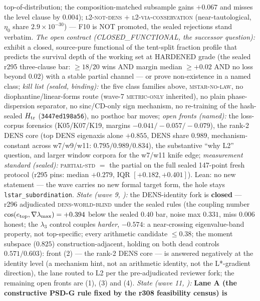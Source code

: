 \documentclass[11pt,a4paper]{article}
\begin{document}
{top-of-distribution; the composition-matched subsample gains
$+0.067$ and misses the level clause by $0.004$);
\textsc{l2-not-dens} $+$ \textsc{l2-via-conservation}
(near-tautological, $\eta_0$ share $2.9\times10^{-30}$) --- F10 is
NOT promoted, the sealed rejections stand verbatim.  \emph{The open
contract (CLOSED\_FUNCTIONAL, the successor question):} exhibit a
closed, source-pure functional of the tent-split fraction profile
that predicts the survival depth of the working set at HARDENED
grade (the sealed r295 three-clause bar: $\ge 18/20$ wins AND
margin median $\ge +0.02$ AND no loss beyond $0.02$) with a stable
partial channel --- or prove non-existence in a named class;
\emph{kill list (sealed, binding):} the five class families above,
\textsc{mstar-no-law}, no diophantine/linear-forms route (wave-7
\textsc{metric-only} inherited), no plain phase-dispersion
separator, no sinc/CD-only sign mechanism, no re-training of the
hash-sealed $H_{\rm tr}$ (\texttt{3447ed198a56}), no posthoc bar
moves; \emph{open fronts (named):} the loss-corpus forensics
(K05/K07/K19, margins $-0.041/-0.057/-0.079$), the rank-2 DENS core
(top DENS eigenaxis alone $+0.855$, DENS share $0.989$,
mechanism-constant across w7/w9/w11: $0.795/0.989/0.834$), the
substantive ``why L2'' question, and larger window corpora for the
w7/w11 knife edge; \emph{measurement standard (sealed):}
\textsc{partial-std} $=$ the partial on the full sealed 147-point
fresh protocol (r295 pins: median $+0.279$, IQR $[+0.182,
+0.401]$).  Lean: no new statement --- the wave carries no new
formal target form, the hole stays \texttt{lstar\_subordination}.
\emph{State (wave 9, ):} the
DENS-identity fork is \textbf{closed} --- r296 adjudicated
\textsc{dens-world-blind} under the sealed rules (the coupling
number $\cos(e_{\rm top}, \nabla\lambda_{\max}) = +0.394$ below the
sealed $0.40$ bar, noise max $0.331$, miss $0.006$ honest; the
$\lambda_3$ control couples \emph{harder}, $-0.574$: a
near-crossing eigenvalue-band property, not top-specific; every
arithmetic candidate $\le 0.38$; the moment subspace ($0.825$)
construction-adjacent, holding on both dead controls
$0.571/0.603$): front (2) --- the rank-2 DENS core --- is answered
negatively at the identity level (a mechanism hint, not an
arithmetic identity, not the L*-gradient direction), the lane
routed to L2 per the pre-adjudicated reviewer fork; the remaining
open fronts are (1), (3) and (4).
\emph{State (wave 11,
):} \textbf{Lane A (the
constructive PSD-G rule fixed by the r308 feasibility census) is
}}
\end{document}
